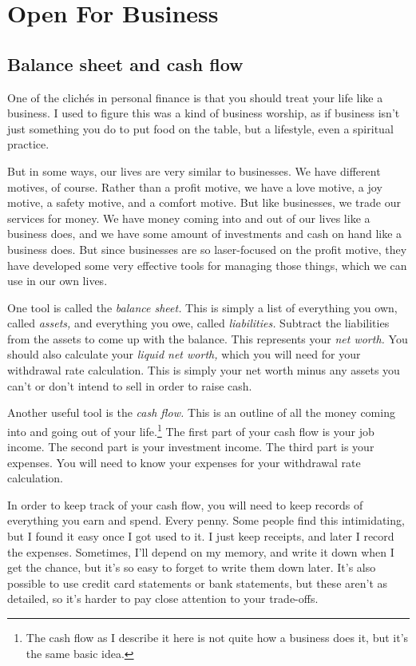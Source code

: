 \chapter{Open For Business}

\section{Balance sheet and cash flow}
One of the clich\'es in personal finance is that you should treat your life like a business. I used to figure this was a kind of business worship, as if business isn't just something you do to put food on the table, but a lifestyle, even a spiritual practice.

But in some ways, our lives are very similar to businesses. We have different motives, of course. Rather than a profit motive, we have a love motive, a joy motive, a safety motive, and a comfort motive. But like businesses, we trade our services for money. We have money coming into and out of our lives like a business does, and we have some amount of investments and cash on hand like a business does. But since businesses are so laser-focused on the profit motive, they have developed some very effective tools for managing those things, which we can use in our own lives.

One tool is called the \emph{balance sheet.} This is simply a list of everything you own, called \emph{assets,} and everything you owe, called \emph{liabilities.} Subtract the liabilities from the assets to come up with the balance. This represents your \emph{net worth.} You should also calculate your \emph{liquid net worth,} which you will need for your withdrawal rate calculation. This is simply your net worth minus any assets you can't or don't intend to sell in order to raise cash.

Another useful tool is the \emph{cash flow.} This is an outline of all the money coming into and going out of your life.\footnote{The cash flow as I describe it here is not quite how a business does it, but it's the same basic idea.} The first part of your cash flow is your job income. The second part is your investment income. The third part is your expenses. You will need to know your expenses for your withdrawal rate calculation.

In order to keep track of your cash flow, you will need to keep records of everything you earn and spend. Every penny. Some people find this intimidating, but I found it easy once I got used to it. I just keep receipts, and later I record the expenses. Sometimes, I'll depend on my memory, and write it down when I get the chance, but it's so easy to forget to write them down later. It's also possible to use credit card statements or bank statements, but these aren't as detailed, so it's harder to pay close attention to your trade-offs.

